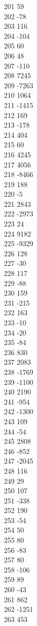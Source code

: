 { 201	59 \\
 202	-78 \\
 203	116 \\
 204	-104 \\
 205	60 \\
 206	48 \\
 207	-110 \\
 208	7245 \\
 209	-7263 \\
 210	1064 \\
 211	-1415 \\
 212	169 \\
 213	-178 \\
 214	404 \\
 215	60 \\
 216	4245 \\
 217	4056 \\
 218	-8466 \\
 219	188 \\
 220	-5 \\
 221	2843 \\
 222	-2973 \\
 223	24 \\
 224	9182 \\
 225	-9329 \\
 226	128 \\
 227	-30 \\
 228	117 \\
 229	-88 \\
 230	159 \\
 231	-215 \\
 232	163 \\
 233	-10 \\
 234	-20 \\
 235	-84 \\
 236	830 \\
 237	2083 \\
 238	-1769 \\
 239	-1100 \\
 240	2190 \\
 241	-954 \\
 242	-1300 \\
 243	109 \\
 244	-54 \\
 245	2808 \\
 246	-852 \\
 247	-2045 \\
 248	116 \\
 249	29 \\
 250	107 \\
 251	-338 \\
 252	190 \\
 253	-54 \\
 254	50 \\
 255	80 \\
 256	-83 \\
 257	80 \\
 258	-106 \\
 259	89 \\
 260	-43 \\
 261	862 \\
 262	-1251 \\
 263	453 \\
}
